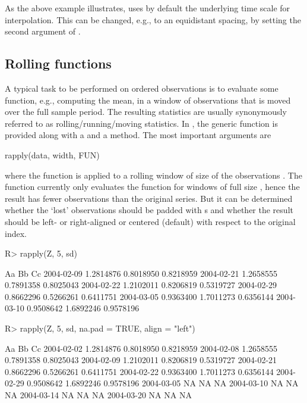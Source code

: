 \documentclass{Z}
\begin{document}
As the above example illustrates,  uses by default
the underlying time scale for interpolation. This can be changed, e.g.,
to an equidistant spacing, by setting the second argument of
.

\subsection{Rolling functions}
\label{sec:rolling}

A typical task to be performed on ordered observations is to evaluate some
function, e.g., computing the mean, in a window of observations that is moved
over the full sample period. The resulting statistics are usually synonymously referred to
as rolling/running/moving statistics. In , the generic function  
is provided along with a  and a  method. The most important arguments
are

\begin{Scode}
rapply(data, width, FUN)
\end{Scode}

where the function  is applied to a rolling window of size 
of the observations . The function  currently only evaluates
the function for windows of full size , hence the result has 
fewer observations than the original series. But it can be determined whether the `lost'
observations should be padded with s and whether the result should be left-
or right-aligned or centered (default) with respect to the original index.

\begin{Schunk}
\begin{Sinput}
R> rapply(Z, 5, sd)
\end{Sinput}
\begin{Soutput}
                  Aa        Bb        Cc
2004-02-09 1.2814876 0.8018950 0.8218959
2004-02-21 1.2658555 0.7891358 0.8025043
2004-02-22 1.2102011 0.8206819 0.5319727
2004-02-29 0.8662296 0.5266261 0.6411751
2004-03-05 0.9363400 1.7011273 0.6356144
2004-03-10 0.9508642 1.6892246 0.9578196
\end{Soutput}
\begin{Sinput}
R> rapply(Z, 5, sd, na.pad = TRUE, align = "left")
\end{Sinput}
\begin{Soutput}
                  Aa        Bb        Cc
2004-02-02 1.2814876 0.8018950 0.8218959
2004-02-08 1.2658555 0.7891358 0.8025043
2004-02-09 1.2102011 0.8206819 0.5319727
2004-02-21 0.8662296 0.5266261 0.6411751
2004-02-22 0.9363400 1.7011273 0.6356144
2004-02-29 0.9508642 1.6892246 0.9578196
2004-03-05        NA        NA        NA
2004-03-10        NA        NA        NA
2004-03-14        NA        NA        NA
2004-03-20        NA        NA        NA
\end{Soutput}
\end{Schunk}
\end{document}
